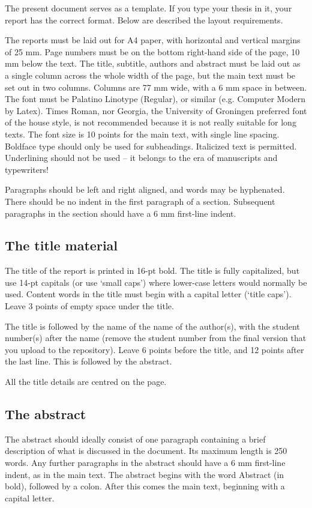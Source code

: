 The present document serves as a template. If you type your thesis in it, your report has the correct format. Below are described the layout requirements.

The reports must be laid out for A4 paper, with horizontal and vertical margins of 25 mm. Page numbers must be on the bottom right-hand side of the page, 10 mm below the text. The title, subtitle, authors and abstract must be laid out as a single column across the whole width of the page, but the main text must be set out in two columns. Columns are 77 mm wide, with a 6 mm space in between.
The font must be Palatino Linotype (Regular), or similar (e.g. Computer Modern by Latex). Times Roman, nor Georgia, the University of Groningen preferred font of the house style, is not recommended because it is not really suitable for long texts. The font size is 10 points for the main text, with single line spacing. Boldface type should only be used for subheadings. Italicized text is permitted. Underlining should not be used – it belongs to the era of manuscripts and typewriters!

Paragraphs should be left and right aligned, and words may be hyphenated. There should be no indent in the first paragraph of a section. Subsequent paragraphs in the section should have a 6 mm first-line indent.

\subsection{The title material}\label{sec:_title_material}
The title of the report is printed in 16-pt bold. The title is fully capitalized, but use 14-pt capitals (or use `small caps') where lower-case letters would normally be used.  Content words in the title must begin with a capital letter (`title caps'). Leave 3 points of empty space under the title.

The title is followed by the name of the name of the author(s), with the student number(s) after the name (remove the student number from the final version that you upload to the repository).
Leave 6 points before the title, and 12 points after the last line. This is followed by the abstract.

All the title details are centred on the page.

\subsection{The abstract}\label{sec:_abstract_layout}
The abstract should ideally consist of one paragraph containing a brief description of what is discussed in the document. Its maximum length is 250 words. Any further paragraphs in the abstract should have a 6 mm first-line indent, as in the main text. The abstract begins with the word Abstract (in bold), followed by a colon. After this comes the main text, beginning with a capital letter.

